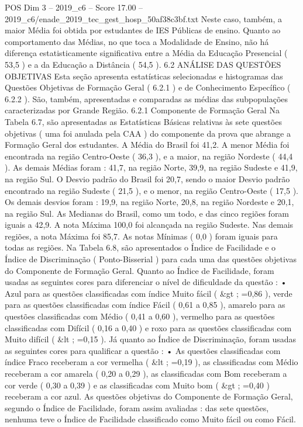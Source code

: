 \begin{textsample}{POS Dim 3 – 2019\_c6 – Score 17.00 – 2019\_c6/enade\_2019\_tec\_gest\_hosp\_50af38c3bf.txt}
Neste caso, também, a maior Média foi obtida por estudantes de IES Públicas de ensino.
Quanto ao comportamento das Médias, no que toca a Modalidade de Ensino, não há diferença estatisticamente significativa entre a Média da Educação Presencial ( 53,5 ) e a da Educação a Distância ( 54,5 ). 6.2 ANÁLISE DAS QUESTÕES OBJETIVAS Esta seção apresenta estatísticas selecionadas e histogramas das Questões Objetivas de Formação Geral ( 6.2.1 ) e de Conhecimento Específico ( 6.2.2 ).
São, também, apresentadas e comparadas as médias das subpopulações caracterizadas por Grande Região. 6.2.1 Componente de Formação Geral Na Tabela 6.7, são apresentadas as Estatísticas Básicas relativas às sete questões objetivas ( uma foi anulada pela CAA ) do componente da prova que abrange a Formação Geral dos estudantes.
A Média do Brasil foi 41,2.
A menor Média foi encontrada na região Centro-Oeste ( 36,3 ), e a maior, na região Nordeste ( 44,4 ).
As demais Médias foram : 41,7, na região Norte, 39,9, na região Sudeste e 41,9, na região Sul.
O Desvio padrão do Brasil foi 20,7, sendo o maior Desvio padrão encontrado na região Sudeste ( 21,5 ), e o menor, na região Centro-Oeste ( 17,5 ).
Os demais desvios foram : 19,9, na região Norte, 20,8, na região Nordeste e 20,1, na região Sul.
As Medianas do Brasil, como um todo, e das cinco regiões foram iguais a 42,9.
A nota Máxima 100,0 foi alcançada na região Sudeste.
Nas demais regiões, a nota Máxima foi 85,7.
As notas Mínimas ( 0,0 ) foram iguais para todas as regiões.
Na Tabela 6.8, são apresentados o Índice de Facilidade e o Índice de Discriminação ( Ponto-Bisserial ) para cada uma das questões objetivas do Componente de Formação Geral.
Quanto ao Índice de Facilidade, foram usadas as seguintes cores para diferenciar o nível de dificuldade da questão : • Azul para as questões classificadas com índice Muito fácil ( \&gt ; =0,86 ), verde para as questões classificadas com índice Fácil ( 0,61 a 0,85 ), amarelo para as questões classificadas com Médio ( 0,41 a 0,60 ), vermelho para as questões classificadas com Difícil ( 0,16 a 0,40 ) e roxo para as questões classificadas com Muito difícil ( \&lt ; =0,15 ).
Já quanto ao Índice de Discriminação, foram usadas as seguintes cores para qualificar a questão : • As questões classificadas com índice Fraco receberam a cor vermelha ( \&lt ; =0,19 ), as classificadas com Médio receberam a cor amarela ( 0,20 a 0,29 ), as classificadas com Bom receberam a cor verde ( 0,30 a 0,39 ) e as classificadas com Muito bom ( \&gt ; =0,40 ) receberam a cor azul.
As questões objetivas do Componente de Formação Geral, segundo o Índice de Facilidade, foram assim avaliadas : das sete questões, nenhuma teve o Índice de Facilidade classificado como Muito fácil ou como Fácil.

\end{textsample}
